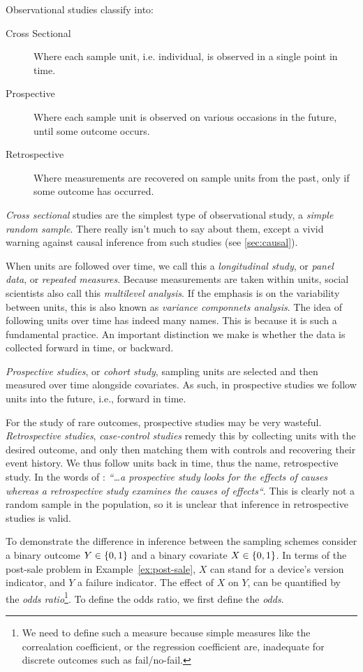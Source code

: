 Observational studies classify into:
\begin{description}
	\item[Cross Sectional] Where each sample unit, i.e. individual, is observed in a single point in time. 
	\item[Prospective] Where each sample unit is observed on various occasions in the future, until some outcome occurs. 
	\item[Retrospective] Where measurements are recovered on sample units from the past, only if some outcome has occurred. 
\end{description}


\emph{Cross sectional} studies are the simplest type of observational study, \aka a \emph{simple random sample}. 
There really isn't much to say about them, except a vivid warning against causal inference from such studies (see \ref{sec:causal}).


When units are followed over time, we call this a \emph{longitudinal study}, or \emph{panel data}, or \emph{repeated measures}.
Because measurements are taken within units, social scientists also call this \emph{multilevel analysis}.
If the emphasis is on the variability between units, this is also known as \emph{variance componnets analysis}.
The idea of following units over time has indeed many names. This is because it is such a fundamental practice. 
An important distinction we make is whether the data is collected forward in time, or backward. 

\emph{Prospective studies}, or \emph{cohort study}, sampling units are selected and then measured over time alongside covariates. 
As such, in prospective studies we follow units into the future, i.e., forward in time. 


For the study of rare outcomes, prospective studies may be very wasteful. 
\emph{Retrospective studies}, \aka \emph{case-control studies} remedy this by collecting units with the desired outcome, and only then matching them with controls and recovering their event history. 
We thus follow units back in time, thus the name, retrospective study.
In the words of \cite{cox_principles_2011}: {\em ``\dots a prospective study looks for the effects of causes whereas a retrospective study examines the causes of effects``}.
This is clearly not a random sample in the population, so it is unclear that inference in retrospective studies is valid. 

To demonstrate the difference in inference between the sampling schemes consider a binary outcome $Y\in\{ 0,1 \}$ and a binary covariate $X\in\{ 0,1 \}$. 
In terms of the post-sale problem in Example~\ref{ex:post-sale}, $X$ can stand for a device's version indicator, and $Y$ a failure indicator. 
The effect of $X$ on $Y$, can be quantified by the \emph{odds ratio}\footnote{We need to define such a measure because simple measures like the correalation coefficient, or the regression coefficient are, inadequate for discrete outcomes such as fail/no-fail.}. 
To define the odds ratio, we first define the \emph{odds}.

